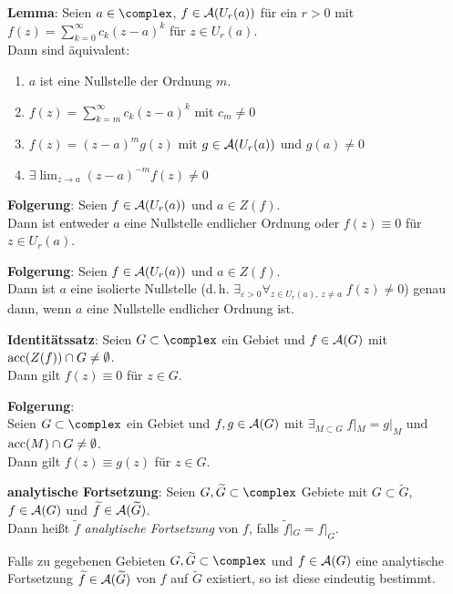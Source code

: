 \linie

\textbf{Lemma}:
Seien $a \in \complex$, $f \in \mathcal{A}(U_r(a))$ für ein $r > 0$ mit
$f(z) = \sum_{k=0}^\infty c_k (z - a)^k$ für $z \in U_r(a)$.\\
Dann sind äquivalent:
\begin{enumerate}
    \item
    $a$ ist eine Nullstelle der Ordnung $m$.
    
    \item
    $f(z) = \sum_{k=m}^\infty c_k (z - a)^k$ mit $c_m \not= 0$
    
    \item
    $f(z) = (z - a)^m g(z)$ mit $g \in \mathcal{A}(U_r(a))$ und $g(a) \not= 0$
    
    \item
    $\exists \lim_{z \to a} (z - a)^{-m} f(z) \not= 0$
\end{enumerate}

\textbf{Folgerung}:
Seien $f \in \mathcal{A}(U_r(a))$ und $a \in Z(f)$.\\
Dann ist entweder $a$ eine Nullstelle endlicher Ordnung oder
$f(z) \equiv 0$ für $z \in U_r(a)$.

\textbf{Folgerung}:
Seien $f \in \mathcal{A}(U_r(a))$ und $a \in Z(f)$.\\
Dann ist $a$ eine isolierte Nullstelle
(d.\,h. $\exists_{\varepsilon > 0} \forall_{z \in U_r(a),\, z \not= a}\;
f(z) \not= 0$) genau dann, wenn $a$ eine Nullstelle endlicher Ordnung ist.

\linie

\textbf{Identitätssatz}:
Seien $G \subset \complex$ ein Gebiet und $f \in \mathcal{A}(G)$ mit
$\operatorname{acc}(Z(f)) \cap G \not= \emptyset$.\\
Dann gilt $f(z) \equiv 0$ für $z \in G$.

\textbf{Folgerung}:\\
Seien $G \subset \complex$ ein Gebiet und $f, g \in \mathcal{A}(G)$ mit
$\exists_{M \subset G}\; f|_M = g|_M$ und $\operatorname{acc}(M) \cap G \not= \emptyset$.\\
Dann gilt $f(z) \equiv g(z)$ für $z \in G$.

\textbf{analytische Fortsetzung}:
Seien $G, \widetilde{G} \subset \complex$ Gebiete mit $G \subset \widetilde{G}$,
$f \in \mathcal{A}(G)$ und $\widetilde{f} \in \mathcal{A}(\widetilde{G})$.\\
Dann heißt $\widetilde{f}$ \emph{analytische Fortsetzung} von $f$,
falls $\widetilde{f}|_G = f|_G$.

Falls zu gegebenen Gebieten $G, \widetilde{G} \subset \complex$ und
$f \in \mathcal{A}(G)$ eine analytische Fortsetzung
$\widetilde{f} \in \mathcal{A}(\widetilde{G})$ von $f$
auf $\widetilde{G}$ existiert, so ist diese eindeutig bestimmt.

